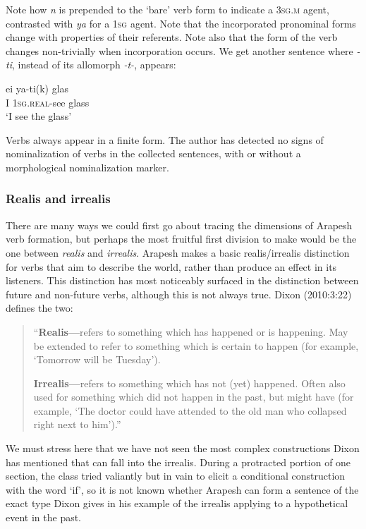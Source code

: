 \documentclass[pdftex,12pt,letterpaper]{article}
\let\ipa\textipa
\begin{document}
 \noindent Note how \emph{n\ipa{@}} is prepended to the `bare' verb form to indicate a \textsc{3sg.m} agent, contrasted with \emph{ya} for a \textsc{1sg} agent. Note that the incorporated pronominal forms change with properties of their referents. Note also that the form of the verb changes non-trivially when incorporation occurs. We get another sentence where \emph{-ti}, instead of its allomorph \emph{-t\ipa{1r1}-}, appears:
 
 \begin{exe}
 \ex 
 \gll ei ya-ti(k) glas \\
 I 1\textsc{sg.real}-see glass \\
 \trans `I see the glass'
 \end{exe}
 
 Verbs always appear in a finite form. The author has detected no signs of nominalization of verbs in the collected sentences, with or without a morphological nominalization marker.
 
 \subsubsection{Realis and irrealis}

 There are many ways we could first go about tracing the dimensions of Arapesh verb formation, but perhaps the most fruitful first division to make would be the one between \emph{realis} and \emph{irrealis}. Arapesh makes a basic realis/irrealis distinction for verbs that aim to describe the world, rather than produce an effect in its listeners. This distinction has most noticeably surfaced in the distinction between future and non-future verbs, although this is not always true. Dixon (2010:3:22) defines the two: 
 
 \singlespacing\begin{quote}
 ``\textbf{Realis---}refers to something which has happened or is happening. May be extended to refer to something which is certain to happen (for example, `Tomorrow will be Tuesday').
 
 \textbf{Irrealis---}refers to something which has not (yet) happened. Often also used for something which did not happen in the past, but might have (for example, ‘The doctor could have attended to the old man who collapsed right next to him’).''
 \end{quote} \doublespacing
 
 \noindent We must stress here that we have not seen the most complex constructions Dixon has mentioned that can fall into the irrealis. During a protracted portion of one section, the class tried valiantly but in vain to elicit a conditional construction with the word `if', so it is not known whether Arapesh can form a sentence of the exact type Dixon gives in his example of the irrealis applying to a hypothetical event in the past. 
 
\end{document}
